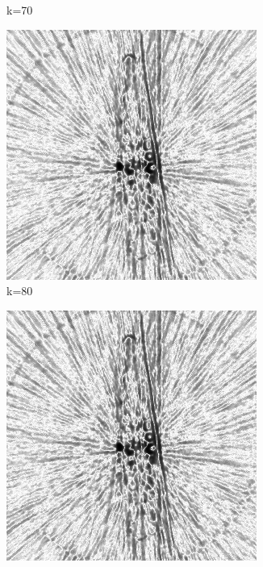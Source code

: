 \documentclass[journal]{IEEEtran}
\begin{document}
\begin{figure}[h]
\begin{subfigure}[b]{0.24\linewidth}
        \caption{k=70}
     \end{subfigure}
  \begin{subfigure}[b]{0.24\linewidth}
        \includegraphics[width=\textwidth]{../images/okra/post_TCI/2D/48_views/tuning_k/weightsIm_kk_80_lambda_prior_0.700000.png}
        \caption{k=80}
     \end{subfigure}
   \begin{subfigure}[b]{0.24\linewidth}
        \includegraphics[width=\textwidth]{../images/okra/post_TCI/2D/48_views/tuning_k/weightsIm_kk_90_lambda_prior_0.700000.png}

\end{subfigure}
\end{figure}
\end{document}
